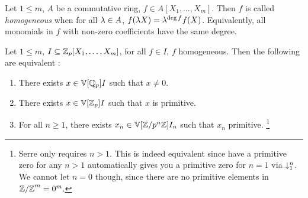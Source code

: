 \begin{dfn}
  
  Let $1 \leq m$, $A$ be a commutative ring,
  $f \in A[X_1,\dots,X_m]$. 
  Then $f$ is called \emph{homogeneous} when 
  for all $\lambda \in A$, $f(\lambda X) = \lambda^{\deg f} f(X)$.
  Equivalently, all monomials in $f$ with non-zero coefficients 
  have the same degree. 
\end{dfn}

\begin{prop}

  Let $1\leq m$, $I \subseteq \mathbb{Z}_p[X_1,\dots,X_m]$,
  for all $f \in I$, $f$ homogeneous. 
  Then the following are equivalent : 
  \begin{enumerate}
    \item There exists $x \in \mathbb{V}[\mathbb{Q}_p]{I}$ such that $x \neq 0$.
    \item There exists $x \in \mathbb{V}[\mathbb{Z}_p]{I}$ such that $x$ is primitive.
    \item For all $n \geq 1$, 
    there exists $x_n \in \mathbb{V}[\mathbb{Z}/p^n\mathbb{Z}]{I_n}$ such that $x_n$ primitive.
    \footnote{
      Serre only requires $n > 1$. 
      This is indeed equivalent since have a primitive zero for any $n > 1$
      automatically gives you a primitive zero for $n = 1$ via $\downarrow_{1}^{n}$. 
      We cannot let $n = 0$ though, since there are no primitive elements in 
      ${\mathbb{Z}/\mathbb{Z}}^m = 0^m$. 
    }
  \end{enumerate}
\end{prop}

